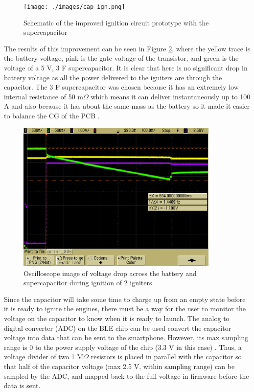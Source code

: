 \documentclass{workreport}
\begin{document}
\begin{body}
	\begin{figure}[!ht]
		\centering
		\texttt{[image: ./images/cap\_ign.png]}
		\caption{Schematic of the improved ignition circuit prototype with the supercapacitor}
		\label{fig:cap_ign}
	\end{figure}

	The results of this improvement can be seen in Figure \ref{fig:via_supercap_fresh}, where the yellow trace is the battery voltage, pink is the gate voltage of the transistor, and green is the voltage of a 5 V, 3 F supercapacitor. It is clear that here is no significant drop in battery voltage as all the power delivered to the igniters are through the capacitor. The 3 F supercapacitor was chosen because it has an extremely low internal resistance of 50 m$\Omega$ which means it can deliver instantaneously up to 100 A and also because it has about the same mass as the battery so it made it easier to balance the CG of the PCB \cite{supercap_doc}.

	\begin{figure}[!ht]
		\centering
		\includegraphics[width=10cm]{./images/via_supercap_fresh.png}
		\caption{Oscilloscope image of voltage drop across the battery and supercapacitor during ignition of 2 igniters}
		\label{fig:via_supercap_fresh}
	\end{figure}

	Since the capacitor will take some time to charge up from an empty state before it is ready to ignite the engines, there must be a way for the user to monitor the voltage on the capacitor to know when it is ready to launch. The analog to digital converter (ADC) on the BLE chip can be used convert the capacitor voltage into data that can be sent to the smartphone. However, its max sampling range is 0 to the power supply voltage of the chip (3.3 V in this case) \cite{nrf52_doc}. Thus, a voltage divider of two 1 M$\Omega$ resistors is placed in parallel with the capacitor so that half of the capacitor voltage (max 2.5 V, within sampling range) can be sampled by the ADC, and mapped back to the full voltage in firmware before the data is sent.


\end{body}
\end{document}
